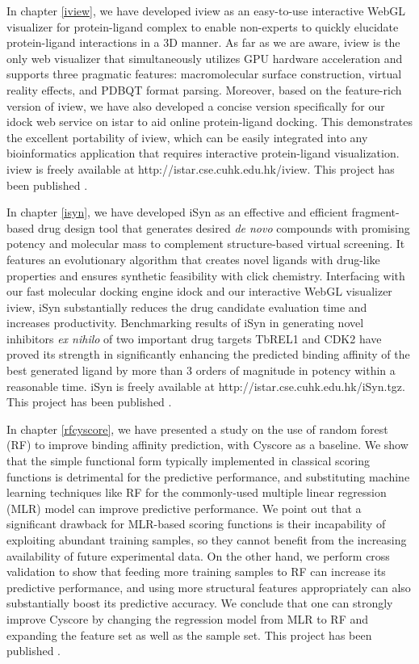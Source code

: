 In chapter \ref{iview}, we have developed iview \citep{1366} as an easy-to-use interactive WebGL visualizer for protein-ligand complex to enable non-experts to quickly elucidate protein-ligand interactions in a 3D manner. As far as we are aware, iview is the only web visualizer that simultaneously utilizes GPU hardware acceleration and supports three pragmatic features: macromolecular surface construction, virtual reality effects, and PDBQT format parsing. Moreover, based on the feature-rich version of iview, we have also developed a concise version specifically for our idock web service on istar to aid online protein-ligand docking. This demonstrates the excellent portability of iview, which can be easily integrated into any bioinformatics application that requires interactive protein-ligand visualization. iview is freely available at http://istar.cse.cuhk.edu.hk/iview. This project has been published \citep{1366}.

In chapter \ref{isyn}, we have developed iSyn \citep{1409,1387} as an effective and efficient fragment-based drug design tool that generates desired \textit{de novo} compounds with promising potency and molecular mass to complement structure-based virtual screening. It features an evolutionary algorithm that creates novel ligands with drug-like properties and ensures synthetic feasibility with click chemistry. Interfacing with our fast molecular docking engine idock and our interactive WebGL visualizer iview, iSyn substantially reduces the drug candidate evaluation time and increases productivity. Benchmarking results of iSyn in generating novel inhibitors \textit{ex nihilo} of two important drug targets TbREL1 and CDK2 have proved its strength in significantly enhancing the predicted binding affinity of the best generated ligand by more than 3 orders of magnitude in potency within a reasonable time. iSyn is freely available at http://istar.cse.cuhk.edu.hk/iSyn.tgz. This project has been published \citep{1409,1387}.

In chapter \ref{rfcyscore}, we have presented a study on the use of random forest (RF) to improve binding affinity prediction, with Cyscore \citep{1372} as a baseline. We show that the simple functional form typically implemented in classical scoring functions is detrimental for the predictive performance, and substituting machine learning techniques like RF for the commonly-used multiple linear regression (MLR) model can improve predictive performance. We point out that a significant drawback for MLR-based scoring functions is their incapability of exploiting abundant training samples, so they cannot benefit from the increasing availability of future experimental data. On the other hand, we perform cross validation to show that feeding more training samples to RF can increase its predictive performance, and using more structural features appropriately can also substantially boost its predictive accuracy. We conclude that one can strongly improve Cyscore by changing the regression model from MLR to RF and expanding the feature set as well as the sample set. This project has been published \citep{1432}.

